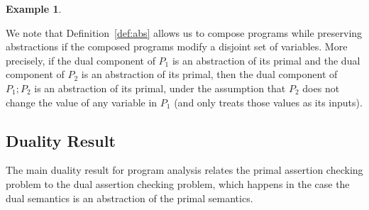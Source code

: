 \documentclass[preprint]{sig-alternate-05-2015}
\newtheorem{example}{Example}
\def\zero{{\tt{zero}}}
\def\int{{\tt{int}}}
\def\ds{{\mathit{\theta}}}   %
\def\V{{\tt{Vars}}}
\def\zero{{\mathtt{zero}}}
\begin{document}
\begin{example}
%
\end{example}

We note that Definition~\ref{def:abs} allows us to compose programs
while preserving abstractions if the composed programs modify a
disjoint set of variables.  More precisely,
if the dual component of $P_1$ is an abstraction of its primal
and
   the dual component of $P_2$ is an abstraction of its primal,
then 
   the dual component of $P_1;P_2$ is an abstraction of its primal,
under the assumption that $P_2$ does not change the value of any
variable in $P_1$ (and only treats those values as its inputs).


\subsection{Duality Result}

The main duality result for program analysis relates
the primal assertion checking problem to the dual assertion
checking problem, which happens in the case the dual
semantics is an abstraction of the primal semantics.
\end{document}
